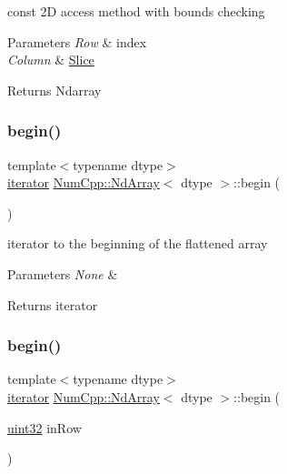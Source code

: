 const 2D access method with bounds checking


\begin{DoxyParams}{Parameters}
{\em Row} & index \\
\hline
{\em Column} & \mbox{\hyperlink{class_num_cpp_1_1_slice}{Slice}} \\
\hline
\end{DoxyParams}
\begin{DoxyReturn}{Returns}
Ndarray 
\end{DoxyReturn}
\mbox{\label{class_num_cpp_1_1_nd_array_a2c6eb3423503beaf4c70938122c39ea9}} 
\subsubsection{\texorpdfstring{begin()}{begin()}\hspace{0.1cm}{\footnotesize\ttfamily [1/2]}}
{\footnotesize\ttfamily template$<$typename dtype$>$ \\
\mbox{\hyperlink{class_num_cpp_1_1_nd_array_ac56493775d6c0ff556ed7d6c9e7c07b4}{iterator}} \mbox{\hyperlink{class_num_cpp_1_1_nd_array}{Num\+Cpp\+::\+Nd\+Array}}$<$ dtype $>$\+::begin (\begin{DoxyParamCaption}{ }\end{DoxyParamCaption})\hspace{0.3cm}{\ttfamily [inline]}}

iterator to the beginning of the flattened array


\begin{DoxyParams}{Parameters}
{\em None} & \\
\hline
\end{DoxyParams}
\begin{DoxyReturn}{Returns}
iterator 
\end{DoxyReturn}
\mbox{\label{class_num_cpp_1_1_nd_array_a6f3e40957ac38eb4fa0694b03309f525}} 
\subsubsection{\texorpdfstring{begin()}{begin()}\hspace{0.1cm}{\footnotesize\ttfamily [2/2]}}
{\footnotesize\ttfamily template$<$typename dtype$>$ \\
\mbox{\hyperlink{class_num_cpp_1_1_nd_array_ac56493775d6c0ff556ed7d6c9e7c07b4}{iterator}} \mbox{\hyperlink{class_num_cpp_1_1_nd_array}{Num\+Cpp\+::\+Nd\+Array}}$<$ dtype $>$\+::begin (\begin{DoxyParamCaption}\item[{\mbox{\hyperlink{namespace_num_cpp_a36f388e948380413c63011cab9b7fbd5}{uint32}}}]{in\+Row }\end{DoxyParamCaption})\hspace{0.3cm}{\ttfamily [inline]}}

